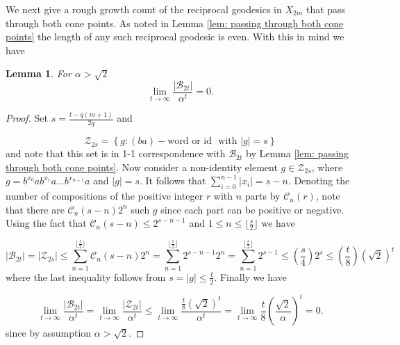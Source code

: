 \documentclass[11pt]{amsart}
\numberwithin{equation}{section}
\theoremstyle{plain}
\newtheorem{lem}[thm]{Lemma}
\begin{document}
 

We next give a rough growth count of  the reciprocal geodesics
in $X_{2m}$ that pass through both cone points.  As noted  in Lemma \ref{lem: passing through both cone points} the length of any such reciprocal geodesic is even. With this in mind we have 


 




\begin{lem} \label{lem:Reciprocal thru both cone points}
For $\alpha > \sqrt{2}$
\begin{equation}
\lim_{t\to\infty}\dfrac{|\mathcal{B}_{2t}|}{\alpha^{t}}=0.
\end{equation}
\end{lem}

\begin{proof}
Set $s=\frac{t-q(m+1)}{2q}$ and 

 \[
 \mathcal{Z}_{2s}=\left\{g:  (ba)-\textrm{word or id } \text{ with }
  |g|=s \right\}
 \]
and note that this set is in 1-1 correspondence with 
$\mathcal{B}_{2t}$ by Lemma \ref{lem: passing through both cone points}.
Now consider a non-identity element $g\in\mathcal{Z}_{2s}$, where $g=b^{x_0}ab^{x_1}a\dots b^{x_{n-1}}a$ and $|g|=s$.  It follows that $\sum_{i=0}^{n-1} |x_i|=s-n$.  Denoting   the number of compositions of the positive integer $r$ with $n$ parts by  $\mathcal{C}_{n}(r)$,  note that there are 
 $\mathcal{C}_{n}(s-n) 2^{n}$ such $g$ since each part can be positive or negative. Using the fact  that 
  $\mathcal{C}_{n}(s-n) \leq 2^{s-n-1}$ and 
  $1 \leq n \leq \lfloor\frac{s}{2}\rfloor$ we have

\begin{equation*}
|\mathcal{B}_{2t}|=|\mathcal{Z}_{2s}|\leq\displaystyle
\sum_{n=1}^{\lfloor\frac{s}{2}\rfloor}\mathcal{C}_{n}(s-n)2^n=\displaystyle\sum_{n=1}^{\lfloor\frac{s}{2}\rfloor}2^{s-n-1}2^n=\displaystyle\sum_{n=1}^{\lfloor\frac{s}{2}\rfloor}2^{s-1}\leq  \left(\frac{s}{4}\right)2^{s}
\leq \left( \frac{t}{8}\right) (\sqrt{2})^{t}
\end{equation*}
where the last inequality follows from 
$s=|g|\leq \frac{t}{2}$.  Finally we have

\[\displaystyle\lim_{t\to\infty}\dfrac{|\mathcal{B}_{2t}|}{\alpha^{t}}=\displaystyle\lim_{t\to\infty}\dfrac{|\mathcal{Z}_{2t}|}{\alpha^{t}}\leq\displaystyle\lim_{t\to\infty}\dfrac{\frac{t}{8}(\sqrt{2})^{t}}{\alpha^t}=\displaystyle\lim_{t\to\infty}\frac{t}{8}\left(\frac{\sqrt{2}}{\alpha}\right)^t=0.\]
since  by assumption $\alpha>\sqrt{2}$.
\end{proof}
\end{document}
